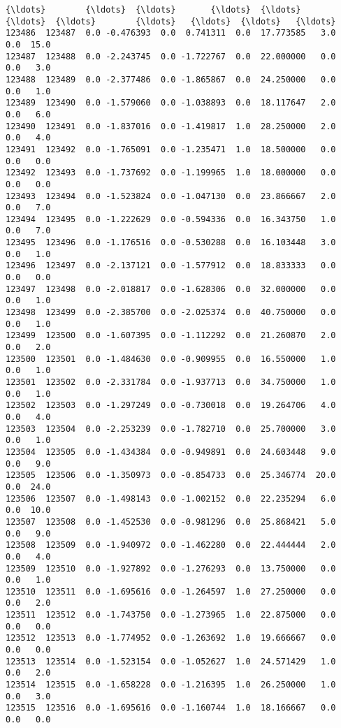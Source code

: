 \documentclass[11pt]{article}
\begin{document}
\begin{Verbatim}[commandchars=\\\{\}]
{\ldots}        {\ldots}  {\ldots}       {\ldots}  {\ldots}       {\ldots}  {\ldots}        {\ldots}   {\ldots}  {\ldots}   {\ldots}   
123486  123487  0.0 -0.476393  0.0  0.741311  0.0  17.773585   3.0  0.0  15.0   
123487  123488  0.0 -2.243745  0.0 -1.722767  0.0  22.000000   0.0  0.0   3.0   
123488  123489  0.0 -2.377486  0.0 -1.865867  0.0  24.250000   0.0  0.0   1.0   
123489  123490  0.0 -1.579060  0.0 -1.038893  0.0  18.117647   2.0  0.0   6.0   
123490  123491  0.0 -1.837016  0.0 -1.419817  1.0  28.250000   2.0  0.0   4.0   
123491  123492  0.0 -1.765091  0.0 -1.235471  1.0  18.500000   0.0  0.0   0.0   
123492  123493  0.0 -1.737692  0.0 -1.199965  1.0  18.000000   0.0  0.0   0.0   
123493  123494  0.0 -1.523824  0.0 -1.047130  0.0  23.866667   2.0  0.0   7.0   
123494  123495  0.0 -1.222629  0.0 -0.594336  0.0  16.343750   1.0  0.0   7.0   
123495  123496  0.0 -1.176516  0.0 -0.530288  0.0  16.103448   3.0  0.0   1.0   
123496  123497  0.0 -2.137121  0.0 -1.577912  0.0  18.833333   0.0  0.0   0.0   
123497  123498  0.0 -2.018817  0.0 -1.628306  0.0  32.000000   0.0  0.0   1.0   
123498  123499  0.0 -2.385700  0.0 -2.025374  0.0  40.750000   0.0  0.0   1.0   
123499  123500  0.0 -1.607395  0.0 -1.112292  0.0  21.260870   2.0  0.0   2.0   
123500  123501  0.0 -1.484630  0.0 -0.909955  0.0  16.550000   1.0  0.0   1.0   
123501  123502  0.0 -2.331784  0.0 -1.937713  0.0  34.750000   1.0  0.0   1.0   
123502  123503  0.0 -1.297249  0.0 -0.730018  0.0  19.264706   4.0  0.0   4.0   
123503  123504  0.0 -2.253239  0.0 -1.782710  0.0  25.700000   3.0  0.0   1.0   
123504  123505  0.0 -1.434384  0.0 -0.949891  0.0  24.603448   9.0  0.0   9.0   
123505  123506  0.0 -1.350973  0.0 -0.854733  0.0  25.346774  20.0  0.0  24.0   
123506  123507  0.0 -1.498143  0.0 -1.002152  0.0  22.235294   6.0  0.0  10.0   
123507  123508  0.0 -1.452530  0.0 -0.981296  0.0  25.868421   5.0  0.0   9.0   
123508  123509  0.0 -1.940972  0.0 -1.462280  0.0  22.444444   2.0  0.0   4.0   
123509  123510  0.0 -1.927892  0.0 -1.276293  0.0  13.750000   0.0  0.0   1.0   
123510  123511  0.0 -1.695616  0.0 -1.264597  1.0  27.250000   0.0  0.0   2.0   
123511  123512  0.0 -1.743750  0.0 -1.273965  1.0  22.875000   0.0  0.0   0.0   
123512  123513  0.0 -1.774952  0.0 -1.263692  1.0  19.666667   0.0  0.0   0.0   
123513  123514  0.0 -1.523154  0.0 -1.052627  1.0  24.571429   1.0  0.0   2.0   
123514  123515  0.0 -1.658228  0.0 -1.216395  1.0  26.250000   1.0  0.0   3.0   
123515  123516  0.0 -1.695616  0.0 -1.160744  1.0  18.166667   0.0  0.0   0.0   


\end{Verbatim}
\end{document}
